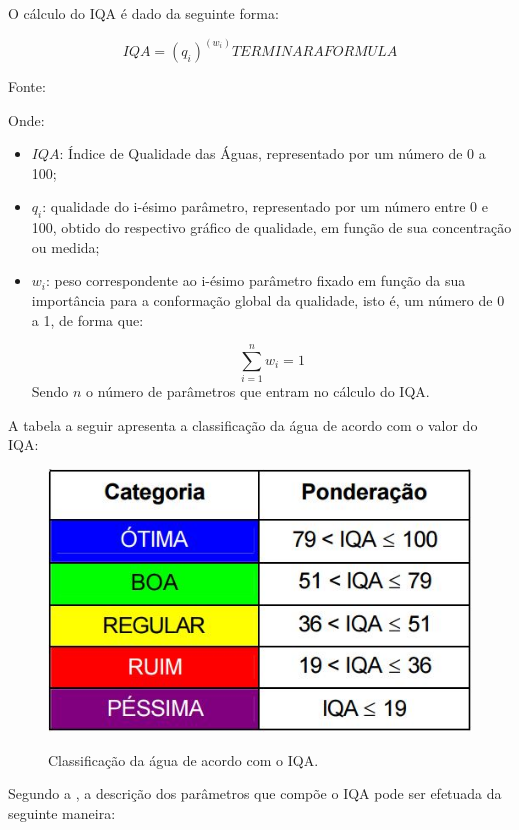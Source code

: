 O cálculo do IQA é dado da seguinte forma:

$$ IQA = (q_i)^(w_i) TERMINAR A FORMULA $$ 
\begin{center}
Fonte: \cite{anaGovIndicadores}
\end{center}

Onde:

\begin{itemize}
 \item $IQA$: Índice de Qualidade das Águas, representado por um número de 0 a 100;
 \item $q_i$: qualidade do i-ésimo parâmetro, representado por um número entre 0 e 100, obtido do respectivo gráfico de qualidade, em função de sua concentração ou medida;
 \item $w_i$: peso correspondente ao i-ésimo parâmetro fixado em função da sua importância para a conformação global da qualidade, isto é,  um número de 0 a 1, de forma que:
 
    $$ \sum_{i=1}^n w_i = 1 $$
    Sendo $n$ o número de parâmetros que entram no cálculo do IQA.
\end{itemize}

A tabela a seguir apresenta a classificação da água de acordo com o valor do IQA:

\begin{figure}[!h]
\centering
\includegraphics[scale=0.7]{editaveis/figuras/tabela_classificacao_IQA}
\label{tabela_classificacao_IQA}
\caption[Classificação da água de acordo com o IQA]{Classificação da água de acordo com o IQA.\footnotemark}
\end{figure}
\FloatBarrier
{}

Segundo a \cite{anaGovIndicadores}, a descrição dos parâmetros que compõe o IQA pode ser efetuada da seguinte maneira:

